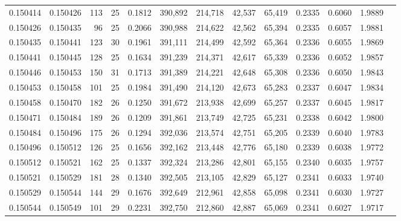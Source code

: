 \begin{tabular}{rrrrrrrrrrrrr}
0.150414 & 0.150426 & 113 &  25 &                                     0.1812 & 390,892 & 214,718 &  42,537 &  65,419 & 0.2335 & 0.6060 & 1.9889 \\
0.150426 & 0.150435 &  96 &  25 &                                     0.2066 & 390,988 & 214,622 &  42,562 &  65,394 & 0.2335 & 0.6057 & 1.9881 \\
0.150435 & 0.150441 & 123 &  30 &                                     0.1961 & 391,111 & 214,499 &  42,592 &  65,364 & 0.2336 & 0.6055 & 1.9869 \\
0.150441 & 0.150445 & 128 &  25 &                                     0.1634 & 391,239 & 214,371 &  42,617 &  65,339 & 0.2336 & 0.6052 & 1.9857 \\
0.150446 & 0.150453 & 150 &  31 &                                     0.1713 & 391,389 & 214,221 &  42,648 &  65,308 & 0.2336 & 0.6050 & 1.9843 \\
0.150453 & 0.150458 & 101 &  25 &                                     0.1984 & 391,490 & 214,120 &  42,673 &  65,283 & 0.2337 & 0.6047 & 1.9834 \\
0.150458 & 0.150470 & 182 &  26 &                                     0.1250 & 391,672 & 213,938 &  42,699 &  65,257 & 0.2337 & 0.6045 & 1.9817 \\
0.150471 & 0.150484 & 189 &  26 &                                     0.1209 & 391,861 & 213,749 &  42,725 &  65,231 & 0.2338 & 0.6042 & 1.9800 \\
0.150484 & 0.150496 & 175 &  26 &                                     0.1294 & 392,036 & 213,574 &  42,751 &  65,205 & 0.2339 & 0.6040 & 1.9783 \\
0.150496 & 0.150512 & 126 &  25 &                                     0.1656 & 392,162 & 213,448 &  42,776 &  65,180 & 0.2339 & 0.6038 & 1.9772 \\
0.150512 & 0.150521 & 162 &  25 &                                     0.1337 & 392,324 & 213,286 &  42,801 &  65,155 & 0.2340 & 0.6035 & 1.9757 \\
0.150521 & 0.150529 & 181 &  28 &                                     0.1340 & 392,505 & 213,105 &  42,829 &  65,127 & 0.2341 & 0.6033 & 1.9740 \\
0.150529 & 0.150544 & 144 &  29 &                                     0.1676 & 392,649 & 212,961 &  42,858 &  65,098 & 0.2341 & 0.6030 & 1.9727 \\
0.150544 & 0.150549 & 101 &  29 &                                     0.2231 & 392,750 & 212,860 &  42,887 &  65,069 & 0.2341 & 0.6027 & 1.9717 \\

\end{tabular}
